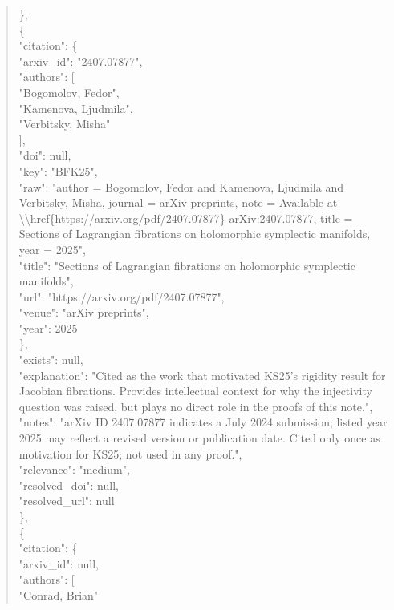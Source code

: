\documentclass[11pt]{article}
\begin{document}
\begin{quote}
    \},\\
    \{\\
      "citation": \{\\
        "arxiv\_id": "2407.07877",\\
        "authors": [\\
          "Bogomolov, Fedor",\\
          "Kamenova, Ljudmila",\\
          "Verbitsky, Misha"\\
        ],\\
        "doi": null,\\
        "key": "BFK25",\\
        "raw": "author = Bogomolov, Fedor and Kamenova, Ljudmila and Verbitsky, Misha, journal = arXiv preprints, note = Available at \textbackslash{}\textbackslash{}href\{https://arxiv.org/pdf/2407.07877\} arXiv:2407.07877, title = Sections of Lagrangian fibrations on holomorphic symplectic manifolds, year = 2025",\\
        "title": "Sections of Lagrangian fibrations on holomorphic symplectic manifolds",\\
        "url": "https://arxiv.org/pdf/2407.07877",\\
        "venue": "arXiv preprints",\\
        "year": 2025\\
      \},\\
      "exists": null,\\
      "explanation": "Cited as the work that motivated KS25's rigidity result for Jacobian fibrations. Provides intellectual context for why the injectivity question was raised, but plays no direct role in the proofs of this note.",\\
      "notes": "arXiv ID 2407.07877 indicates a July 2024 submission; listed year 2025 may reflect a revised version or publication date. Cited only once as motivation for KS25; not used in any proof.",\\
      "relevance": "medium",\\
      "resolved\_doi": null,\\
      "resolved\_url": null\\
    \},\\
    \{\\
      "citation": \{\\
        "arxiv\_id": null,\\
        "authors": [\\
          "Conrad, Brian"\\

\end{quote}
\end{document}
